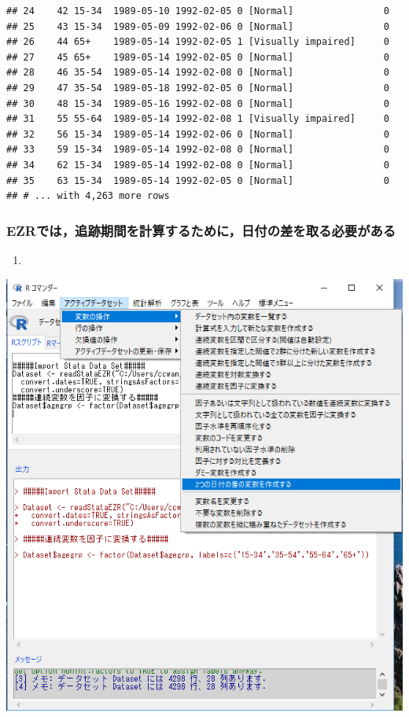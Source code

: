 \documentclass[11pt,]{problemset}
\begin{document}
\begin{verbatim}
## 24    42 15-34  1989-05-10 1992-02-05 0 [Normal]                0
## 25    43 15-34  1989-05-09 1992-02-06 0 [Normal]                0
## 26    44 65+    1989-05-14 1992-02-05 1 [Visually impaired]     0
## 27    45 65+    1989-05-14 1992-02-05 0 [Normal]                0
## 28    46 35-54  1989-05-14 1992-02-08 0 [Normal]                0
## 29    47 35-54  1989-05-18 1992-02-05 0 [Normal]                0
## 30    48 15-34  1989-05-16 1992-02-08 0 [Normal]                0
## 31    55 55-64  1989-05-14 1992-02-08 1 [Visually impaired]     0
## 32    56 15-34  1989-05-14 1992-02-06 0 [Normal]                0
## 33    59 15-34  1989-05-14 1992-02-08 0 [Normal]                0
## 34    62 15-34  1989-05-14 1992-02-08 0 [Normal]                0
## 35    63 15-34  1989-05-14 1992-02-05 0 [Normal]                0
## # ... with 4,263 more rows
\end{verbatim}

\newpage
\vfill

\hypertarget{ezr}{%
\subsubsection{EZRでは，追跡期間を計算するために，日付の差を取る必要がある}\label{ezr}}

\begin{enumerate}
\def\labelenumi{\arabic{enumi}.}
\item
\end{enumerate}

\begin{center}\includegraphics[width=0.7\linewidth,height=0.5\textheight]{pic/survival00} \end{center}
\end{document}
